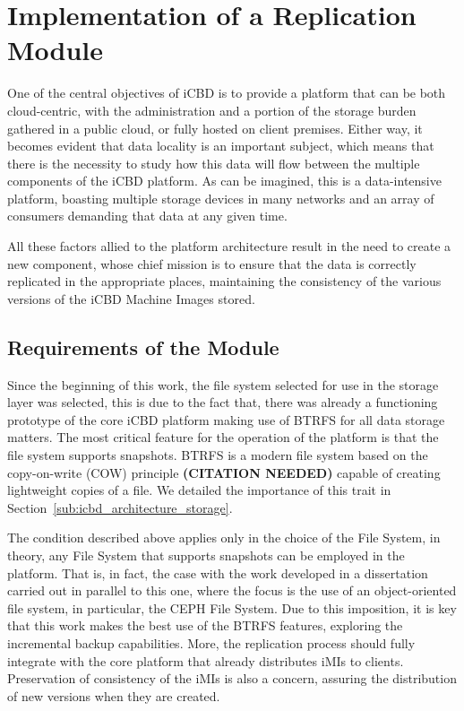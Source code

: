 \section{Implementation of a Replication Module}
\label{sec:impl_replication}

One of the central objectives of iCBD is to provide a platform that can be both cloud-centric, with the administration and a portion of the storage burden gathered in a public cloud, or fully hosted on client premises. Either way, it becomes evident that data locality is an important subject, which means that there is the necessity to study how this data will flow between the multiple components of the iCBD platform.
As can be imagined, this is a data-intensive platform, boasting multiple storage devices in many networks and an array of consumers demanding that data at any given time.

All these factors allied to the platform architecture result in the need to create a new component, whose chief mission is to ensure that the data is correctly replicated in the appropriate places, maintaining the consistency of the various versions of the iCBD Machine Images stored.

\subsection{Requirements of the Module}
\label{sub:requirements_icbdrep}

Since the beginning of this work, the file system selected for use in the storage layer was selected, this is due to the fact that, there was already a functioning prototype of the core iCBD platform making use of BTRFS for all data storage matters. The most critical feature for the operation of the platform is that the file system supports snapshots. BTRFS is a modern file system based on the copy-on-write (COW) principle \textbf{(CITATION NEEDED)} capable of creating lightweight copies of a file. We detailed the importance of this trait in Section~\ref{sub:icbd_architecture_storage}.
 
The condition described above applies only in the choice of the File System, in theory, any File System that supports snapshots can be employed in the platform. That is, in fact, the case with the work developed in a dissertation carried out in parallel to this one, where the focus is the use of an object-oriented file system, in particular, the CEPH File System.
Due to this imposition, it is key that this work makes the best use of the BTRFS features, exploring the incremental backup capabilities. More, the replication process should fully integrate with the core platform that already distributes iMIs to clients. Preservation of consistency of the iMIs is also a concern, assuring the distribution of new versions when they are created.

